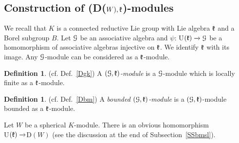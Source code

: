 \documentclass[12pt]{amsart}
\theoremstyle{definition}\newtheorem{theorem}{Theorem}[section]
\theoremstyle{definition}\newtheorem{definition}[proposition]{Definition}
\theoremstyle{remark}\newtheorem{example}[proposition]{Example}
\renewcommand{\to}[1][]{\xrightarrow{#1}}
\begin{document}
\subsection{Construction of (D($W), \frak k$)-modules} We recall that $K$ is a connected reductive Lie group with Lie algebra $\frak k$ and a Borel subgroup $B$. Let $\EuScript G$ be an associative algebra and $\psi$: U$(\frak k)\to\EuScript G$ be a homomorphism of associative algebras injective on $\frak k$. We identify $\frak k$ with its image. Any $\EuScript G$-module can be considered as a $\frak k$-module.
\begin{definition}(cf. Def.~\ref{Dgk}) A {\it $(\EuScript G, \frak k)$-module} is a $\EuScript G$-module which is locally finite as a $\frak k$-module.\end{definition}
\begin{definition}(cf. Def.~\ref{Dbm}) A {\it bounded $(\EuScript G, \frak k)$-module} is a $(\EuScript G, \frak k)$-module bounded as a $\frak k$-module.\end{definition}
Let $W$ be a spherical $K$-module. There is an obvious homomorphism\\ U$(\frak k)\to$D$(W)$ (see the discussion at the end of Subsection~\ref{SSbmsl}).
\end{document}
